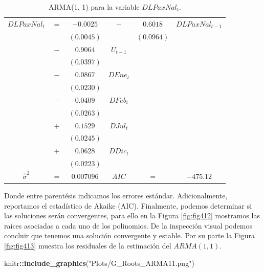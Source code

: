 \documentclass[
]{book}
\newenvironment{Shaded}{\begin{snugshade}}{\end{snugshade}}
\newcommand{\FunctionTok}[1]{\textcolor[rgb]{0.13,0.29,0.53}{\textbf{#1}}}
\newcommand{\NormalTok}[1]{#1}
\newcommand{\SpecialCharTok}[1]{\textcolor[rgb]{0.81,0.36,0.00}{\textbf{#1}}}
\newcommand{\StringTok}[1]{\textcolor[rgb]{0.31,0.60,0.02}{#1}}
\begin{document}
\begin{longtable}[]{@{}cccccc@{}}
\caption{\label{tab:ARMA01} ARMA(1, 1) para la variable \(DLPaxNal_t\).}\tabularnewline
\toprule\noalign{}
\endfirsthead
\endhead
\bottomrule\noalign{}
\endlastfoot
\(DLPaxNal_t\) & \(=\) & \(-0.0025\) & \(-\) & \(0.6018\) & \(DLPaxNal_{t-1}\) \\
& & \((0.0045)\) & & \((0.0964)\) & \\
& \(-\) & \(0.9064\) & \(U_{t-1}\) & & \\
& & \((0.0397)\) & & & \\
& \(-\) & \(0.0867\) & \(DEne_t\) & & \\
& & \((0.0230)\) & & & \\
& \(-\) & \(0.0409\) & \(DFeb_t\) & & \\
& & \((0.0263)\) & & & \\
& \(+\) & \(0.1529\) & \(DJul_t\) & & \\
& & \((0.0245)\) & & & \\
& \(+\) & \(0.0628\) & \(DDic_t\) & & \\
& & \((0.0223)\) & & & \\
\(\hat{\sigma}^2\) & \(=\) & \(0.007096\) & \(AIC\) & \(=\) & \(-475.12\) \\
\end{longtable}

Donde entre parentésis indicamos los errores estándar. Adicionalmente, reportamos el estadístico de Akaike (AIC). Finalmente, podemos determinar si las soluciones serán convergentes, para ello en la Figura \ref{fig:fig412} mostramos las raíces asociadas a cada uno de los polinomios. De la inspección visual podemos concluir que tenemos una solución convergente y estable. Por su parte la Figura \ref{fig:fig413} muestra los residuales de la estimación del \(ARMA(1, 1)\).

\begin{Shaded}
\begin{Highlighting}[]
\NormalTok{knitr}\SpecialCharTok{::}\FunctionTok{include\_graphics}\NormalTok{(}\StringTok{"Plots/G\_Roots\_ARMA11.png"}\NormalTok{) }
\end{Highlighting}
\end{Shaded}
\end{document}
